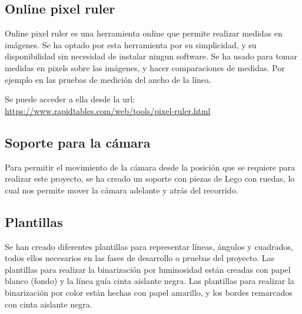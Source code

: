 \subsection{Online pixel ruler}
Online pixel ruler es una herramienta online que permite realizar medidas en imágenes. Se ha optado por esta herramienta por su simplicidad, y su disponibilidad sin necesidad de instalar ningun software. Se ha usado para tomar medidas en pixels sobre las imágenes, y hacer comparaciones de medidas. Por ejemplo en las pruebas de medición del ancho de la línea.

Se puede acceder a ella desde la url: \url{https://www.rapidtables.com/web/tools/pixel-ruler.html}


\subsection{Soporte para la cámara}
Para permitir el movimiento de la cámara desde la posición que se requiere para realizar este proyecto, se ha creado un soporte con piezas de Lego con ruedas, lo cual nos permite mover la cámara adelante y atrás del recorrido.
 
\subsection{Plantillas}
Se han creado diferentes plantillas para representar líneas, ángulos y cuadrados, todos ellos necesarios en las fases de desarrollo o pruebas del proyecto. Las plantillas para realizar la binarización por luminosidad están creadas con papel blanco (fondo) y la línea guía cinta aislante negra. Las plantillas para realizar la binarización por color están hechas con papel amarillo, y los bordes remarcados con cinta aislante negra.

